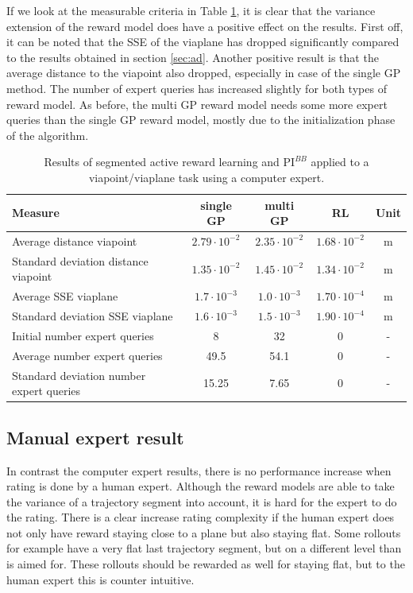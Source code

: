\documentclass[mscThesis.tex]{subfiles}
\begin{document}

If we look at the measurable criteria in Table \ref{tab:ad-var-com}, it is clear that the variance extension of the reward model does have a positive effect on the results. First off, it can be noted that the SSE of the viaplane has dropped significantly compared to the results obtained in section \ref{sec:ad}. Another positive result is that the average distance to the viapoint also dropped, especially in case of the single GP method. The number of expert queries has increased slightly for both types of reward model. As before, the multi GP reward model needs some more expert queries than the single GP reward model, mostly due to the initialization phase of the algorithm.

\begin{table}[!htb]
    \centering
    \caption{Results of segmented active reward learning and $\text{PI}^{BB}$ applied to a viapoint/viaplane task using a computer expert.}
    \label{tab:ad-var-com}
    \begin{tabular}{|p{6cm}|c|c|c|c|}
        \hline
        Measure & single GP & multi GP & RL & Unit \\ \hline \hline
        Average distance viapoint & $2.79 \cdot 10^{-2}$ & $2.35 \cdot 10^{-2}$ & $1.68 \cdot 10^{-2}$ & \si{m}  \\ \hline
        Standard deviation distance viapoint & $1.35 \cdot 10^{-2}$ & $1.45 \cdot 10^{-2}$ & $1.34 \cdot 10^{-2}$ & \si{m} \\ \hline
        Average SSE viaplane & $1.7 \cdot 10^{-3}$ & $1.0 \cdot 10^{-3}$ & $1.70 \cdot 10^{-4}$ & \si{m}  \\ \hline
        Standard deviation SSE viaplane & $1.6 \cdot 10^{-3}$ & $1.5 \cdot 10^{-3}$ & $1.90 \cdot 10^{-4}$ & \si{m} \\ \hline
        Initial number expert queries & 8 & 32 & 0 & - \\ \hline
        Average number expert queries & 49.5 & 54.1 & 0 &  - \\ \hline
        Standard deviation number expert queries & 15.25 & 7.65 & 0 &  - \\ \hline 
    \end{tabular}
\end{table}

\clearpage

\subsection{Manual expert result}
In contrast the computer expert results, there is no performance increase when rating is done by a human expert. Although the reward models are able to take the variance of a trajectory segment into account, it is hard for the expert to do the rating. There is a clear increase rating complexity if the human expert does not only have reward staying close to a plane but also staying flat. Some rollouts for example have a very flat last trajectory segment, but on a different level than is aimed for. These rollouts should be rewarded as well for staying flat, but to the human expert this is counter intuitive.
\end{document}
